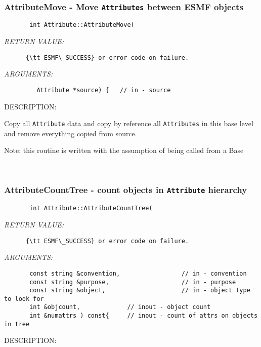  
\mbox{}\hrulefill\
 
\subsubsection [AttributeMove] {AttributeMove - Move {\tt Attributes} between ESMF objects}


  
\begin{verbatim}       int Attribute::AttributeMove(\end{verbatim}{\em RETURN VALUE:}
\begin{verbatim}      {\tt ESMF\_SUCCESS} or error code on failure.\end{verbatim}{\em ARGUMENTS:}
\begin{verbatim}         Attribute *source) {   // in - source\end{verbatim}
{\sf DESCRIPTION:\\ }


     Copy all {\tt Attribute} data and copy by reference all {\tt Attributes} in 
     this base level and remove everything copied from source.  
  
     Note:  this routine is written with the assumption of being called from a Base
   
 
\mbox{}\hrulefill\
 
\subsubsection [AttributeCountTree] {AttributeCountTree - count objects in {\tt Attribute} hierarchy }


  
\begin{verbatim}       int Attribute::AttributeCountTree(
   \end{verbatim}{\em RETURN VALUE:}
\begin{verbatim}      {\tt ESMF\_SUCCESS} or error code on failure.
   \end{verbatim}{\em ARGUMENTS:}
\begin{verbatim}       const string &convention,                 // in - convention
       const string &purpose,                    // in - purpose
       const string &object,                     // in - object type to look for
       int &objcount,             // inout - object count
       int &numattrs ) const{     // inout - count of attrs on objects in tree
   \end{verbatim}
{\sf DESCRIPTION:\\ }


